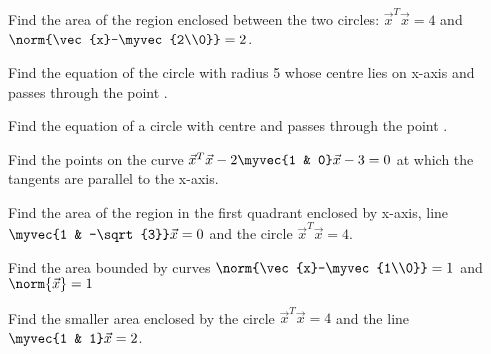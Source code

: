 
\item Find the area of the region enclosed between the two circles: $\vec{x}^T\vec{x} = 4$ and $\norm{\vec{x}-\myvec{2\\0}} = 2$.
\\
\solution 

\item Find the equation of the circle with radius 5 whose centre lies on x-axis and passes through the point .
\\
\solution 

\item Find the equation of a circle with centre  and passes through the point . 
\\
\solution 

%
\item Find the points on the curve $\vec{x}^T\vec{x}-2\myvec{1 & 0}\vec{x} -3 =0$  at which the tangents are parallel to the x-axis.
%
\\
\solution

\item  Find the area of the region in the first quadrant enclosed by x-axis, line $\myvec{1 & -\sqrt{3}}\vec{x} =0$ and the circle $\vec{x}^T\vec{x}=4$.
%
\\
\solution

\item  Find the area bounded by curves $\norm{\vec{x}-\myvec{1\\0}} = 1$ and $\norm{\vec{x}}=1$
\\
\solution

\item Find the smaller area enclosed by the circle $\vec{x}^T\vec{x}=4$ and the line $\myvec{1 & 1}\vec{x} = 2$.
\\
\solution



